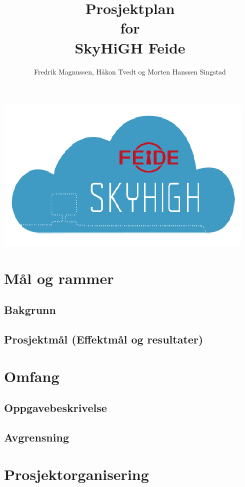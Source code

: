 \documentclass[12pt,a4paper]{article}
\begin{document}
\title{Prosjektplan \\ for \\ SkyHiGH Feide}
\author{Fredrik Magnussen, Håkon Tvedt og Morten Hanssen Singstad}
\maketitle
\begin{center}
\includegraphics[scale=1]{logo.png}
\end{center}

\newpage
\tableofcontents

\newpage
\section{Mål og rammer}
\subsection{Bakgrunn}
\subsection{Prosjektmål (Effektmål og resultater)}

\section{Omfang}
\subsection{Oppgavebeskrivelse}
\subsection{Avgrensning}

\section{Prosjektorganisering}
\end{document}
